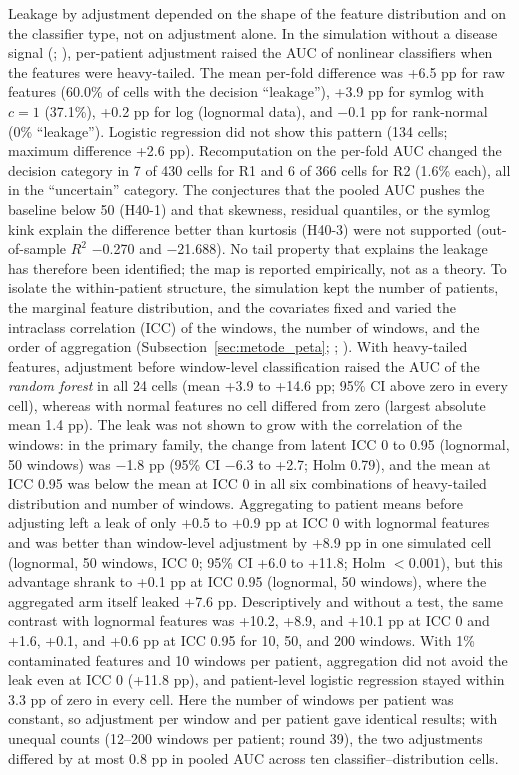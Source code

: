 Leakage by adjustment depended on the shape of the feature distribution and on the classifier type, not on adjustment alone.
In the simulation without a disease signal (; ), per-patient adjustment raised the AUC of nonlinear classifiers when the features were heavy-tailed. The mean per-fold difference was +6.5 pp for raw features (60.0\% of cells with the decision ``leakage''), +3.9 pp for symlog with $c=1$ (37.1\%), +0.2 pp for log (lognormal data), and $-$0.1 pp for rank-normal (0\% ``leakage'').
Logistic regression did not show this pattern (134 cells; maximum difference +2.6 pp).
Recomputation on the per-fold AUC changed the decision category in 7 of 430 cells for R1 and 6 of 366 cells for R2 (1.6\% each), all in the ``uncertain'' category. The conjectures that the pooled AUC pushes the baseline below 50 (H40-1) and that skewness, residual quantiles, or the symlog kink explain the difference better than kurtosis (H40-3) were not supported (out-of-sample $R^2$ $-$0.270 and $-$21.688). No tail property that explains the leakage has therefore been identified; the map is reported empirically, not as a theory.
To isolate the within-patient structure, the simulation kept the number of patients, the marginal feature distribution, and the covariates fixed and varied the intraclass correlation (ICC) of the windows, the number of windows, and the order of aggregation (Subsection~\ref{sec:metode_peta}; ; ).
With heavy-tailed features, adjustment before window-level classification raised the AUC of the \textit{random forest} in all 24 cells (mean +3.9 to +14.6 pp; 95\% CI above zero in every cell), whereas with normal features no cell differed from zero (largest absolute mean 1.4 pp).
The leak was not shown to grow with the correlation of the windows: in the primary family, the change from latent ICC 0 to 0.95 (lognormal, 50 windows) was $-$1.8 pp (95\% CI $-$6.3 to +2.7; Holm 0.79), and the mean at ICC 0.95 was below the mean at ICC 0 in all six combinations of heavy-tailed distribution and number of windows.
Aggregating to patient means before adjusting left a leak of only +0.5 to +0.9 pp at ICC 0 with lognormal features and was better than window-level adjustment by +8.9 pp in one simulated cell (lognormal, 50 windows, ICC 0; 95\% CI +6.0 to +11.8; Holm $<0.001$), but this advantage shrank to +0.1 pp at ICC 0.95 (lognormal, 50 windows), where the aggregated arm itself leaked +7.6 pp. Descriptively and without a test, the same contrast with lognormal features was +10.2, +8.9, and +10.1 pp at ICC 0 and +1.6, +0.1, and +0.6 pp at ICC 0.95 for 10, 50, and 200 windows.
With 1\% contaminated features and 10 windows per patient, aggregation did not avoid the leak even at ICC 0 (+11.8 pp), and patient-level logistic regression stayed within 3.3 pp of zero in every cell.
Here the number of windows per patient was constant, so adjustment per window and per patient gave identical results; with unequal counts (12--200 windows per patient; round 39), the two adjustments differed by at most 0.8 pp in pooled AUC across ten classifier--distribution cells.

